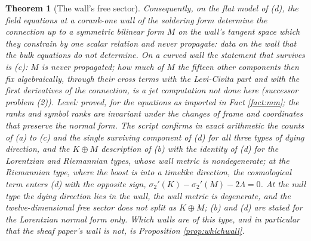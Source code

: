 \documentclass[11pt]{article}
\newtheorem{theorem}{Theorem}[section]
\theoremstyle{definition}
\begin{document}
\begin{theorem}[The wall's free sector]
Consequently, on the flat model of (d), the field equations at a corank-one wall of the soldering form determine the connection up to a symmetric bilinear form $M$ on the wall's tangent space which they constrain by one scalar relation and never propagate: data on the wall that the bulk equations do not determine. On a curved wall the statement that survives is (c): $M$ is never propagated; how much of $M$ the fifteen other components then fix algebraically, through their cross terms with the Levi-Civita part and with the first derivatives of the connection, is a jet computation not done here (successor problem (2)). \emph{Level:} proved, for the equations as imported in Fact \ref{fact:mm}; the ranks and symbol ranks are invariant under the changes of frame and coordinates that preserve the normal form. The script confirms in exact arithmetic the counts of (a) to (c) and the single surviving component of (d) for all three types of dying direction, and the $K \oplus M$ description of (b) with the identity of (d) for the Lorentzian and Riemannian types, whose wall metric is nondegenerate; at the Riemannian type, where the boost is into a timelike direction, the cosmological term enters (d) with the opposite sign, $\sigma_2'(K) - \sigma_2'(M) - 2\Lambda = 0$. At the null type the dying direction lies in the wall, the wall metric is degenerate, and the twelve-dimensional free sector does not split as $K \oplus M$; (b) and (d) are stated for the Lorentzian normal form only. Which walls are of this type, and in particular that the sheaf paper's wall is not, is Proposition \ref{prop:whichwall}.
\end{theorem}
\end{document}
